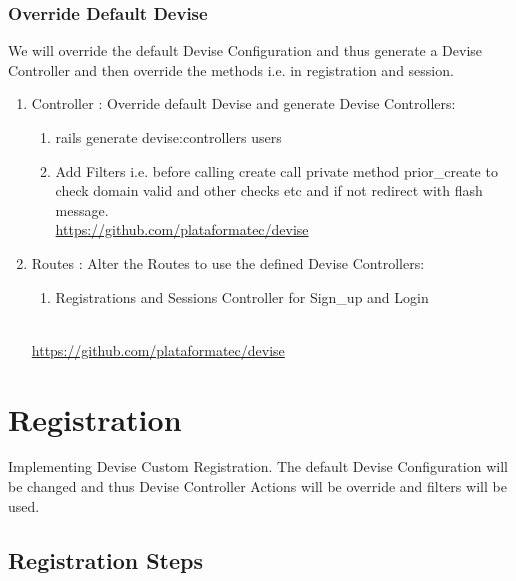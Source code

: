 \documentclass[11pt]{article}
\begin{document}
\subsubsection{Override Default Devise}
We will override the default Devise Configuration and thus generate a Devise Controller and then override the methods i.e. in registration and session.

\begin{enumerate}
	\item Controller : Override default Devise and generate Devise Controllers:
		\begin{enumerate}
			\item rails generate devise:controllers users
			\item Add Filters i.e. before calling create call private method prior\_create to check domain valid and other checks etc and if not redirect with flash message.
			\hfill \\
			{\url{https://github.com/plataformatec/devise}}
		\end{enumerate}
	\item Routes : Alter the Routes to use the defined Devise Controllers:
	\begin{enumerate}
		\item Registrations and Sessions Controller for Sign\_up and Login
	\end{enumerate}
			\hfill \\
			{\url{https://github.com/plataformatec/devise}}
\end{enumerate}

\section{Registration}
Implementing Devise Custom Registration. The default Devise Configuration will be changed and thus Devise Controller Actions will be override and filters will be used.

\subsection{Registration Steps}
\end{document}
